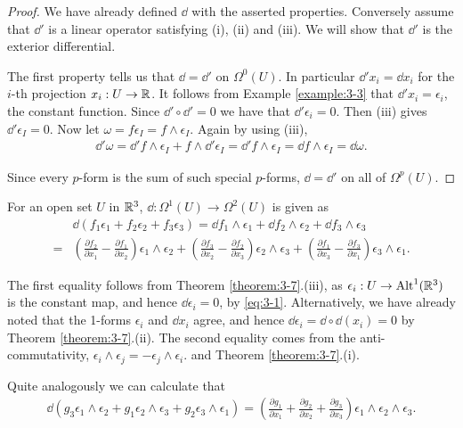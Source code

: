 \begin{proof}
We have already defined $\dd$ with the asserted properties. Conversely assume
that $\dd'$ is a linear operator satisfying (i), (ii) and (iii). We will show that $\dd'$ is
the exterior differential.

The first property tells us that $\dd = \dd'$ on $\Omega^0(U)$. In particular $\dd' x_i = \dd x_i$ for the
$i$-th projection $x_i:U\to{\ensuremath{\mathbb{R}}}$. It follows from Example \ref{example:3-3} that $\dd' x_i = \epsilon_i$, 
the constant function. Since $\dd'\circ\dd' = 0$ we have that $\dd'\epsilon_i=0$. Then (iii) gives $\dd'\epsilon_I = 0$. 
Now let $\omega = f\epsilon_I = f\wedge\epsilon_I$. Again by using (iii),
\begin{align*}
  \dd'\omega = \dd'f\wedge\epsilon_I + f\wedge \dd'\epsilon_I
  = \dd'f\wedge\epsilon_I
  = \dd f\wedge\epsilon_I
  = \dd\omega.  
\end{align*}

Since every $p$-form is the sum of such special $p$-forms, $\dd = \dd'$ on all of $\Omega^p(U)$.
\end{proof}

For an open set $U$ in ${\mathbb{R}}^3$, $\dd:\Omega^1(U)\to\Omega^2(U)$ is given as 
\begin{align*}
  & \dd(f_1\epsilon_1+f_2\epsilon_2+f_3\epsilon_3)
  = \dd f_1\wedge\epsilon_1+\dd f_2\wedge\epsilon_2+\dd f_3\wedge\epsilon_3 \\
  = & \left(\frac{\partial f_{2}}{\partial x_{1}} - \frac{\partial f_{1}}{\partial x_{2}}\right)\epsilon_{1}\wedge\epsilon_{2}
    + \left(\frac{\partial f_{3}}{\partial x_{2}} - \frac{\partial f_{2}}{\partial x_{3}}\right)\epsilon_{2}\wedge\epsilon_{3}
    + \left(\frac{\partial f_{1}}{\partial x_{3}} - \frac{\partial f_{3}}{\partial x_{1}}\right)\epsilon_{3}\wedge\epsilon_{1}.
\end{align*}

The first equality follows from Theorem \ref{theorem:3-7}.(iii), as $\epsilon_i:U\to\operatorname{Alt}^1({\mathbb{R}}^3)$ is the
constant map, and hence $\dd\epsilon_i=0$, by \eqref{eq:3-1}. Alternatively, we have already noted
that the 1-forms $\epsilon_i$ and $\dd x_i$ agree, and hence $\dd\epsilon_i = \dd\circ\dd(x_i) = 0$ 
by Theorem \ref{theorem:3-7}.(ii). The second equality comes from the anti-commutativity, $\epsilon_i\wedge\epsilon_j = -\epsilon_j\wedge\epsilon_i$.
and Theorem \ref{theorem:3-7}.(i).

Quite analogously we can calculate that
\begin{align*}
  \dd(g_3\epsilon_1\wedge\epsilon_2+g_1\epsilon_2\wedge\epsilon_3+g_2\epsilon_3\wedge\epsilon_1)
  = \left(\frac{\partial g_1}{\partial x_1}+\frac{\partial g_2}{\partial x_2}+\frac{\partial g_3}{\partial x_3}\right)
    \epsilon_1\wedge\epsilon_2\wedge\epsilon_3.
\end{align*}

